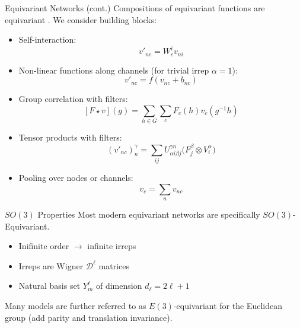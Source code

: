 \documentclass[11pt]{beamer}
\begin{document}
\begin{frame}{Equivariant Networks (cont.)}
Compositions of equivariant functions are equivariant \cite{tacovariant}. We consider building blocks:{\small
\begin{itemize}

	\item Self-interaction:
	$$
	v'_{nc} = W^i_c v_{ni}
	$$
	\item Non-linear functions along channels  (for trivial irrep $\alpha=1$):
	$$
	v'_{nc}=f(v_{nc}+b_{nc})
	$$
	\item Group correlation with filters:
	$$
	[F\star v](g)=\sum_{h\in G}\sum_c F_c(h)v_c(g^{-1}h)
	$$
	\item Tensor products with filters:
	$$
	(v'_{nc})^{\gamma}_{n} = \sum_{ij}U_{\alpha i \beta j}^{\gamma n}\big(F_{j}^{\beta}\otimes V^{\alpha}_i \big) 
	$$
	\item Pooling over nodes or channels:
	$$
	v_c = \sum_n v_{nc}
	$$
\end{itemize}}
\end{frame}
\begin{frame}{$SO(3)$ Properties}
Most modern equivariant networks are specifically $SO(3)$-Equivariant.

\vspace{0.5cm}

\begin{itemize}
\item Inifinite order $\rightarrow$ infinite irreps
\item Irreps are Wigner $\mathcal{D}^{\ell}$ matrices
\item Natural basis set $Y^{\ell}_m$ of dimension $d_{\ell}=2\ell+1$
\end{itemize}

\vspace{0.5cm}

Many models are further referred to as $E(3)$-equivariant for the Euclidean group (add parity and translation invariance).
\end{frame}
\end{document}
